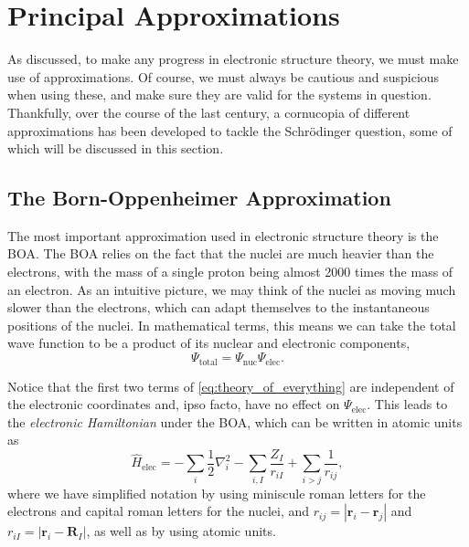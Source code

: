 \section{Principal Approximations}

As discussed, to make any progress in electronic structure theory, we must make use of approximations. Of course, we must always be cautious and suspicious when using these, and make sure they are valid for the systems in question. Thankfully, over the course of the last century, a cornucopia of different approximations has been developed to tackle the Schr\"odinger question, some of which will be discussed in this section.

\subsection{The Born-Oppenheimer Approximation}

The most important approximation used in electronic structure theory is the \gls{BOA}.\cite{bornZur1927} The \gls{BOA} relies on the fact that the nuclei are much heavier than the electrons, with the mass of a single proton being almost 2000 times the mass of an electron. As an intuitive picture, we may think of the nuclei as moving much slower than the electrons, which can adapt themselves to the instantaneous positions of the nuclei. In mathematical terms, this means we can take the total wave function to be a product of its nuclear and electronic components,
\begin{equation}
    \Psi_\mathrm{total} = \Psi_\mathrm{nuc} \Psi_\mathrm{elec}.
\end{equation}

Notice that the first two terms of \eqref{eq:theory_of_everything} are independent of the electronic coordinates and, ipso facto, have no effect on $\Psi_\mathrm{elec}$. This leads to the \emph{electronic Hamiltonian} under the \gls{BOA}, which can be written in atomic units as
\begin{equation}
\label{eq:elec_hamiltonian}
\hat H_\mathrm{elec} = -\sum_{i} \frac{1}{2} \nabla_i^2 - \sum_{i,I} \frac{Z_I}{r_{iI}} + \sum_{i\gt j} \frac{1}{r_{ij}},
\end{equation}
where we have simplified notation by using miniscule roman letters for the electrons and capital roman letters for the nuclei, and $r_{ij}=|\mathbf{r}_i-\mathbf{r}_j|$ and $r_{iI}=|\mathbf{r}_i-\mathbf{R}_I|$, as well as by using atomic units.

